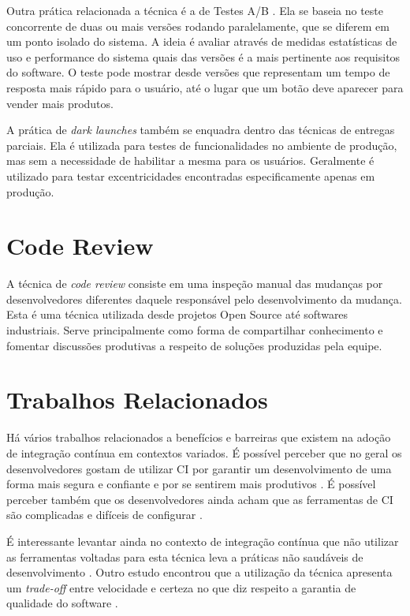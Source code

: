Outra prática relacionada a técnica é a de Testes A/B \cite{testsAB}. Ela se baseia no teste concorrente de duas ou mais versões rodando paralelamente, que se diferem em um ponto isolado do sistema. A ideia é avaliar através de medidas estatísticas de uso e performance do sistema quais das versões é a mais pertinente aos requisitos do software. O teste pode mostrar desde versões que representam um tempo de resposta mais rápido para o usuário, até o lugar que um botão deve aparecer para vender mais produtos.

A prática de \emph{dark launches} \cite{devAndDeploymentFB} também se enquadra dentro das técnicas de entregas parciais. Ela é utilizada para testes de funcionalidades no ambiente de produção, mas sem a necessidade de habilitar a mesma para os usuários. Geralmente é utilizado para testar excentricidades encontradas especificamente apenas em produção.  


\section{Code Review}

A técnica de \emph{code review} \cite{codeReview} consiste em uma inspeção manual das mudanças por desenvolvedores diferentes daquele responsável pelo desenvolvimento da mudança. Esta é uma técnica utilizada desde projetos Open Source até softwares industriais. Serve principalmente como forma de compartilhar conhecimento e fomentar discussões produtivas a respeito de soluções produzidas pela equipe.

\section{Trabalhos Relacionados}

Há vários trabalhos relacionados a benefícios e barreiras que existem na adoção de integração contínua em contextos variados. É possível perceber que no geral os desenvolvedores gostam de utilizar CI por garantir um desenvolvimento de uma forma mais segura e confiante \cite{googleCi} e por se sentirem mais produtivos \cite{hilton2016}. É possível perceber também que os desenvolvedores ainda acham que as ferramentas de CI são complicadas e difíceis de configurar \cite{hilton2016}. 

É interessante levantar ainda no contexto de integração contínua que não utilizar as ferramentas voltadas para esta técnica leva a práticas não saudáveis de desenvolvimento \cite{citheater2019}. Outro estudo encontrou que a utilização da técnica apresenta um \emph{trade-off} entre velocidade e certeza no que diz respeito a garantia de qualidade do software \cite{hilton2016}.

